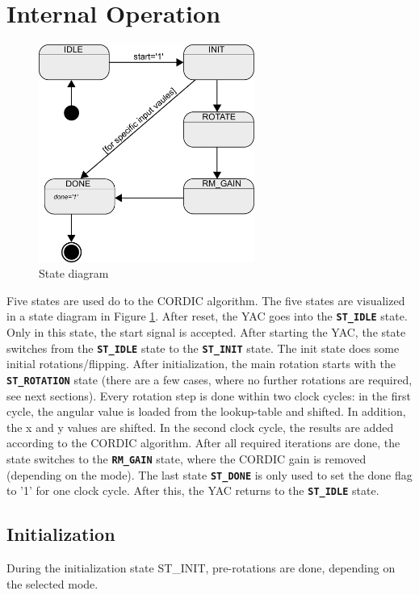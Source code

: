 \documentclass[a4paper, 12pt, notitlepage]{report}
\newcommand{\state}[1]{{\tt\textbf{#1}}}
\begin{document}
\section{Internal Operation}
\begin{figure}[p]
\centering
   \includegraphics[width=200pt]{figs/state_diagram.pdf}
   \caption{State diagram}
   \label{fig:states}
\end{figure}
Five states are used do to the CORDIC algorithm. The five states are visualized in a
state diagram in Figure \ref{fig:states}.
After reset, the YAC goes into the \state{ST\_IDLE} state. Only in this state, the 
start signal is accepted. After starting the YAC, the state switches from
the \state{ST\_IDLE} state to the \state{ST\_INIT} state. The init state does some initial 
rotations/flipping.
After initialization, the main rotation starts with the \state{ST\_ROTATION} state
(there are a few cases, where no further rotations are required, see next sections).
Every rotation step is done within two clock cycles: in the first cycle, 
the angular value is loaded from the lookup-table and shifted. In addition, 
the x and y values are shifted. In the second
clock cycle, the results are added according to the CORDIC algorithm.
After all required iterations are done, the state switches to
the \state{RM\_GAIN} state, where the CORDIC gain is removed (depending on 
the mode). The last state \state{ST\_DONE} is only used to set the done flag to 
'1' for one clock cycle. After this, the YAC returns to the \state{ST\_IDLE} state.



   \subsection{Initialization}
   During the initialization state ST\_INIT, pre-rotations are done, depending on 
   the selected mode.
   
\end{document}
